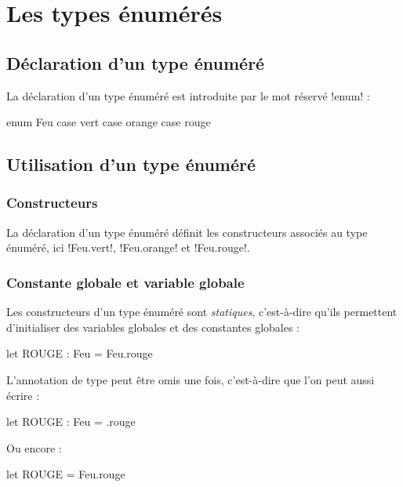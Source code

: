 




\chapter{Les types énumérés}


\section{Déclaration d'un type énuméré}

La déclaration d'un type énuméré est introduite par le mot réservé \omnibus!enum! :

\begin{OMNIBUS}
enum Feu {
  case vert
  case orange
  case rouge
}
\end{OMNIBUS}

\section{Utilisation d'un type énuméré}

\subsection{Constructeurs}
La déclaration d'un type énuméré définit les constructeurs associés au type énuméré, ici \omnibus!Feu.vert!, \omnibus!Feu.orange! et \omnibus!Feu.rouge!.


\subsection{Constante globale et variable globale}
Les constructeurs d'un type énuméré sont \emph{statiques}, c'est-à-dire qu'ils permettent d'initialiser des variables globales et des constantes globales :

\begin{OMNIBUS}
let ROUGE : Feu = Feu.rouge
\end{OMNIBUS}

L'annotation de type peut être omis une fois, c'est-à-dire que l'on peut aussi écrire :
\begin{OMNIBUS}
let ROUGE : Feu = .rouge
\end{OMNIBUS}

Ou encore :
\begin{OMNIBUS}
let ROUGE = Feu.rouge
\end{OMNIBUS}


